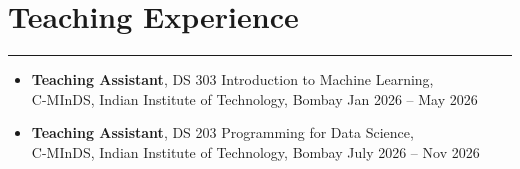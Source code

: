 \documentclass{article}
\begin{document}
\section*{Teaching Experience}
\hrule
\vspace{1em}
\begin{itemize}[leftmargin=*]
    \item[] \textbf{Teaching Assistant}, DS 303 Introduction to Machine Learning,\\ C-MInDS, Indian Institute of Technology, Bombay \hfill Jan 2026 -- May 2026
    \item[] \textbf{Teaching Assistant}, DS 203 Programming for Data Science,\\ C-MInDS, Indian Institute of Technology, Bombay \hfill July 2026 -- Nov 2026
\end{itemize}
\end{document}

